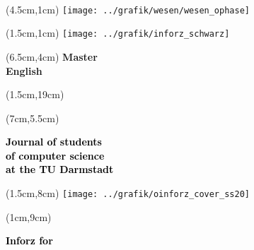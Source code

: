 \begin{titlepage}~





	\begin{textblock*}{12cm}(4.5cm,1cm)
		\texttt{[image: ../grafik/wesen/wesen\_ophase]}
	\end{textblock*}

	\begin{textblock*}{12cm}(1.5cm,1cm)
		\texttt{[image: ../grafik/inforz\_schwarz]}
	\end{textblock*}



	\begin{textblock*}{12cm}(6.5cm,4cm)
		\centering\fontsize{80}{25}\sffamily\textbf{
			\textcolor{mycolor}{Master } \\
			\textcolor{mycolor}{English}}
	\end{textblock*}


	\begin{textblock*}{12cm}(1.5cm,19cm)
		\centering\huge\sffamily\textbf{
		}
	\end{textblock*}


	\begin{textblock*}{7cm}(7cm,5.5cm)
		\begin{flushright}
			\large\sffamily\textbf{
				\textcolor{black}{Journal of students}\\
				\textcolor{black}{of computer science\\at the TU Darmstadt}}
		\end{flushright}
	\end{textblock*}

	\begin{textblock*}{18cm}(1.5cm,8cm)
		\texttt{[image: ../grafik/oinforz\_cover\_ss20]}
	\end{textblock*}

	\begin{textblock*}{5cm}(1cm,9cm)
		\begin{rotate}{90}
			\sffamily\huge\textbf{
				\textcolor{black}{Inforz for \ophase}}
		\end{rotate}
	\end{textblock*}



\end{titlepage}
